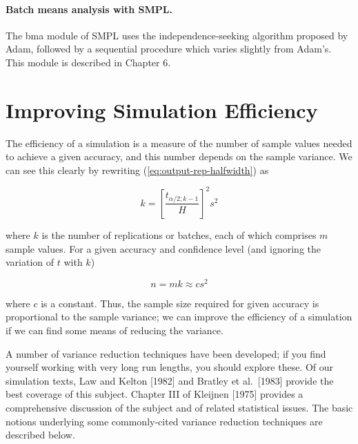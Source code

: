 \paragraph{Batch means analysis with SMPL.}
The bma module of SMPL uses the independence-seeking algorithm proposed by Adam,
followed by a sequential procedure which varies slightly from Adam's. This module
is described in Chapter 6.

\section{Improving Simulation Efficiency}
\label{sec:improving-efficiency}

The efficiency of a simulation is a measure of the number of sample values
needed to achieve a given accuracy, and this number depends on the sample
variance. We can see this clearly by rewriting (\ref{eq:output-rep-halfwidth})
as

\begin{equation}
k = \left[\frac{t_{\alpha/2;k-1}}{H}\right]^2 s^2
\label{eq:output-k-variance}
\end{equation}

where $k$ is the number of replications or batches, each of which comprises $m$
sample values. For a given accuracy and confidence level (and ignoring the
variation of $t$ with $k$)

\begin{equation}
n = mk \approx c s^2
\label{eq:output-n-variance}
\end{equation}

where $c$ is a constant. Thus, the sample size required for given accuracy is
proportional to the sample variance; we can improve the efficiency of a
simulation if we can find some means of reducing the variance.

A number of variance reduction techniques have been developed; if you find
yourself working with very long run lengths, you should explore these. Of our
simulation texts, Law and Kelton [1982] and Bratley et al.\ [1983] provide the
best coverage of this subject. Chapter III of Kleijnen [1975]
\noindent provides a comprehensive discussion of the subject and of related statistical issues. The
basic notions underlying some commonly-cited variance reduction techniques are
described below.

